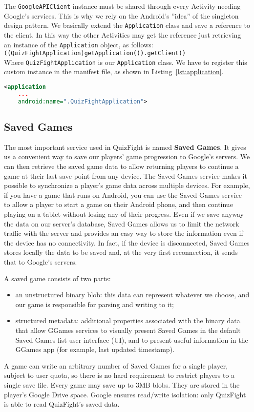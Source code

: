 The \texttt{GoogleAPIClient} instance must be shared through every Activity needing Google's services. This is why we rely on the Android's ''idea'' of the singleton design pattern. We basically extend the \texttt{Application} class and save a reference to the client. In this way the other Activities may get the reference just retrieving an instance of the \texttt{Application} object, as follows: \\
\texttt{((QuizFightApplication)getApplication()).getClient()} \\
Where \texttt{QuizFightApplication} is our \texttt{Application} class. We have to register this custom instance in the manifest file, as shown in Listing~\ref{lst:application}.
\begin{lstlisting}[language=xml, caption={Application declaration}, label={lst:application}]
<application
	...
	android:name=".QuizFightApplication">
\end{lstlisting}

\subsection{Saved Games}
The most important service used in QuizFight is named \textbf{Saved Games}. It gives us a convenient way to save our players' game progression to Google's servers. We can then retrieve the saved game data to allow returning players to continue a game at their last save point from any device. The Saved Games service makes it possible to synchronize a player's game data across multiple devices. For example, if you have a game that runs on Android, you can use the Saved Games service to allow a player to start a game on their Android phone, and then continue playing on a tablet without losing any of their progress. Even if we save anyway the data on our server's database, Saved Games allows us to limit the network traffic with the server and provides an easy way to store the information even if the device has no connectivity. In fact, if the device is disconnected, Saved Games stores locally the data to be saved and, at the very first reconnection, it sends that to Google's servers.

A saved game consists of two parts:
\begin{itemize}
	\item an unstructured binary blob: this data can represent whatever we choose, and our game is responsible for parsing and writing to it;
	\item structured metadata: additional properties associated with the binary data that allow GGames services to visually present Saved Games in the default Saved Games list user interface (UI), and to present useful information in the GGames app (for example, last updated timestamp).
\end{itemize}
A game can write an arbitrary number of Saved Games for a single player, subject to user quota, so there is no hard requirement to restrict players to a single save file. Every game may save up to 3MB blobs. They are stored in the player's Google Drive space. Google ensures read/write isolation: only QuizFight is able to read QuizFight's saved data.

